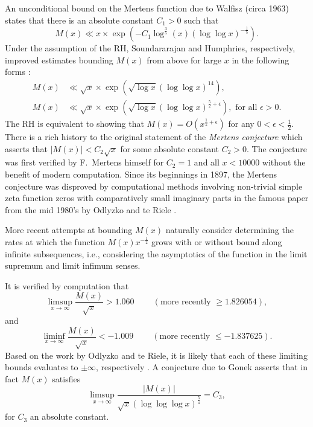 \documentclass[11pt,reqno,a4letter]{article}
\numberwithin{figure}{section}
\numberwithin{table}{section}
\newcommand{\cf}{\textit{cf.\ }}
\newcommand{\seqnum}[1]{\href{http://oeis.org/#1}{\color{ProcessBlue}{\underline{#1}}}}
\theoremstyle{plain}
\numberwithin{theorem}{section}
\theoremstyle{definition}
\begin{document}
An unconditional bound on the Mertens function due to Walfisz (circa 1963) 
states that there is an absolute constant $C_1 > 0$ such that 
$$M(x) \ll x \times \exp\left(-C_1 \log^{\frac{3}{5}}(x) 
  (\log\log x)^{-\frac{1}{5}}\right).$$ 
Under the assumption of the RH, Soundararajan and Humphries, respectively, 
improved estimates bounding $M(x)$ from above for large $x$ in the 
following forms 
\cite{SOUND-MERTENS-ANNALS,HUMPHRIES-JNT-2013}: 
\begin{align*} 
M(x) & \ll \sqrt{x} \times \exp\left(\sqrt{\log x} (\log\log x)^{14}\right), \\ 
M(x) & \ll \sqrt{x} \times \exp\left( 
     \sqrt{\log x} (\log\log x)^{\frac{5}{2}+\epsilon}\right), 
     \text{ for all } \epsilon > 0. 
\end{align*} 
The RH is equivalent to showing that 
$M(x) = O\left(x^{\frac{1}{2}+\epsilon}\right)$ for any 
$0 < \epsilon < \frac{1}{2}$. 
There is a rich history to the original statement of the \emph{Mertens conjecture} which 
asserts that $|M(x)| < C_2 \sqrt{x}$ for some absolute constant $C_2 > 0$. 
The conjecture was first verified by F.~Mertens himself for $C_2 = 1$ and all $x < 10000$ 
without the benefit of modern computation. 
Since its beginnings in 1897, the Mertens conjecture was disproved by computational methods involving 
non-trivial simple zeta function zeros with comparatively small imaginary parts in the 
famous paper from the mid 1980's by 
Odlyzko and te Riele \cite{ODLYZ-TRIELE}. 

More recent attempts 
at bounding $M(x)$ naturally consider determining the rates at which the function 
$M(x) x^{-\frac{1}{2}}$ grows with or without bound along infinite 
subsequences, i.e., considering the asymptotics of the function 
in the limit supremum and limit infimum senses. 

It is verified by computation 
that \cite[\cf \S 4.1]{PRIMEREC} 
\cite[\cf \seqnum{A051400}; \seqnum{A051401}]{OEIS} 
\[
\limsup_{x\rightarrow\infty} \frac{M(x)}{\sqrt{x}} > 1.060\ \qquad (\text{more recently } \geq 1.826054), 
\] 
and 
\[ 
\liminf_{x\rightarrow\infty} \frac{M(x)}{\sqrt{x}} < -1.009\ \qquad (\text{more recently } \leq -1.837625). 
\] 
Based on the work by Odlyzko and te Riele, it is likely that 
each of these limiting bounds evaluates to $\pm \infty$, respectively 
\cite{ODLYZ-TRIELE,MREVISITED,ORDER-MERTENSFN,HURST-2017}. 
A conjecture due to Gonek asserts that in fact 
$M(x)$ satisfies \cite{NG-MERTENS}
$$\limsup_{x \rightarrow \infty} \frac{|M(x)|}{\sqrt{x} (\log\log\log x)^{\frac{5}{4}}} = C_3,$$ 
for $C_3$ an absolute constant. 
\end{document}
